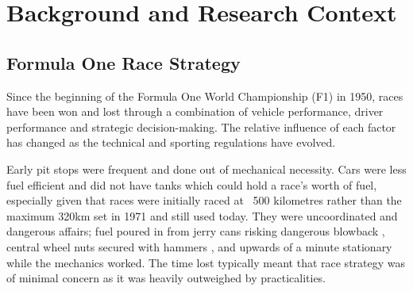 \chapter{Background and Research Context}
\label{chap:background}

%

\section{Formula One Race Strategy}
\label{sec:race-strategy-background}


Since the beginning of the Formula One World Championship (F1) in 1950, races have been won and lost through a combination of vehicle performance, driver performance and strategic decision-making. The relative influence of each factor has changed as the technical and sporting regulations have evolved.

Early pit stops were frequent and done out of mechanical necessity. Cars were less fuel efficient and did not have tanks which could hold a race's worth of fuel, especially given that races were initially raced at ~500 kilometres rather than the maximum 320km set in 1971 \cite{F1Technical2009RaceDistance} and still used today. They were uncoordinated and dangerous affairs; fuel poured in from jerry cans risking dangerous blowback \cite{MotorSport1994Refuelling}, central wheel nuts secured with hammers \cite{Driver612022WheelNuts}, and upwards of a minute stationary while the mechanics worked. The time lost typically meant that race strategy was of minimal concern as it was heavily outweighed by practicalities.

